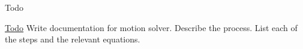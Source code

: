 \begin{DoxyRefDesc}{Todo}
\item[\hyperlink{todo__todo000009}{Todo}]Write documentation for motion solver. Describe the process. List each of the steps and the relevant equations.\end{DoxyRefDesc}

